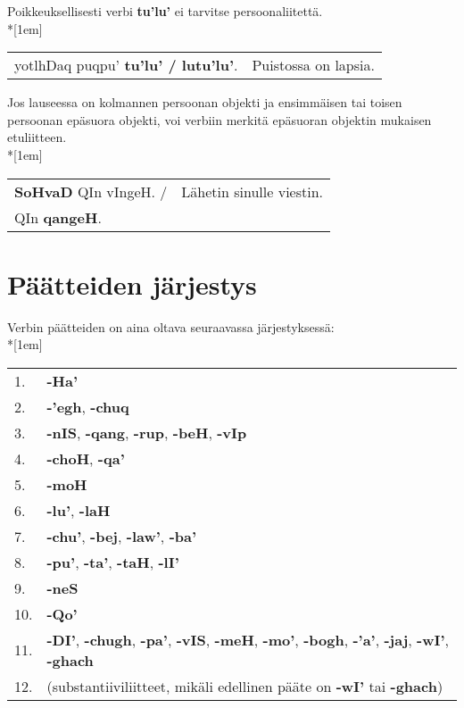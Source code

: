 \documentclass{book}
\begin{document}
Poikkeuksellisesti verbi \textbf{tu'lu'} ei tarvitse persoonaliitettä.
\\*[1em]
\begin{tabular}{l l}
    yotlhDaq puqpu' \textbf{tu'lu' / lutu'lu'}. & Puistossa on lapsia. \\
\end{tabular}

Jos lauseessa on kolmannen persoonan objekti ja ensimmäisen tai toisen persoonan epäsuora objekti, voi verbiin merkitä epäsuoran objektin mukaisen etuliitteen.\\*[1em]
\begin{tabular}{l l}
    \textbf{SoHvaD} QIn vIngeH. / & Lähetin sinulle viestin. \\
    QIn \textbf{qangeH}.
\end{tabular}

\section{Päätteiden järjestys}

Verbin päätteiden on aina oltava seuraavassa järjestyksessä:\\*[1em]
\begin{tabular}{l l}
    1. & \textbf{-Ha'} \\
    2. & \textbf{-'egh}, \textbf{-chuq} \\
    3. & \textbf{-nIS}, \textbf{-qang}, \textbf{-rup}, \textbf{-beH}, \textbf{-vIp} \\
    4. & \textbf{-choH}, \textbf{-qa'} \\
    5. & \textbf{-moH} \\
    6. & \textbf{-lu'}, \textbf{-laH} \\
    7. & \textbf{-chu'}, \textbf{-bej}, \textbf{-law'}, \textbf{-ba'} \\
    8. & \textbf{-pu'}, \textbf{-ta'}, \textbf{-taH}, \textbf{-lI'} \\
    9. & \textbf{-neS} \\
    10. & \textbf{-Qo'} \\
    11. & \textbf{-DI'}, \textbf{-chugh}, \textbf{-pa'}, \textbf{-vIS}, \textbf{-meH}, \textbf{-mo'}, \textbf{-bogh}, \textbf{-'a'}, \textbf{-jaj}, \textbf{-wI'}, \textbf{-ghach} \\
    12. & (substantiiviliitteet, mikäli edellinen pääte on \textbf{-wI'} tai \textbf{-ghach}) \\
\end{tabular}
\end{document}
